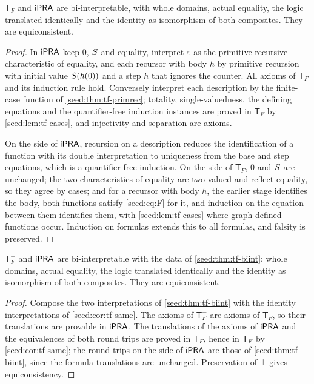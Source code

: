\begin{theorem}[Bi-interpretation]\label{seed:thm:tf-biint}
$\mathsf{T}_F$ and $\mathsf{iPRA}$ are bi-interpretable, with whole domains, actual
equality, the logic translated identically and the identity as isomorphism
of both composites. They are equiconsistent.
\end{theorem}

\begin{proof}
In $\mathsf{iPRA}$ keep $0$, $S$ and equality, interpret $\varepsilon$ as the
primitive recursive characteristic of equality, and each recursor with body
$h$ by primitive recursion with initial value $S(h(0))$ and a step $h$
that ignores the counter. All axioms of $\mathsf{T}_F$ and its induction
rule hold. Conversely interpret each description by the finite-case
function of \cref{seed:thm:tf-primrec}; totality, single-valuedness, the
defining equations and the quantifier-free induction instances are proved in
$\mathsf{T}_F$ by \cref{seed:lem:tf-cases}, and injectivity and separation
are axioms.

On the side of $\mathsf{iPRA}$, recursion on a description reduces the
identification of a function with its double interpretation to uniqueness
from the base and step equations, which is a quantifier-free induction. On
the side of $\mathsf{T}_F$, $0$ and $S$ are unchanged; the two
characteristics of equality are two-valued and reflect equality, so they
agree by cases; and for a recursor with body $h$, the earlier stage
identifies the body, both functions satisfy \eqref{seed:eq:F} for it, and
induction on the equation between them identifies them, with
\cref{seed:lem:tf-cases} where graph-defined functions occur. Induction on
formulas extends this to all formulas, and falsity is preserved.
\end{proof}

\begin{corollary}\label{seed:cor:tf-minus-biint}
$\mathsf{T}_F^{-}$ and $\mathsf{iPRA}$ are bi-interpretable with the data of
\cref{seed:thm:tf-biint}: whole domains, actual equality, the logic
translated identically and the identity as isomorphism of both composites.
They are equiconsistent.
\end{corollary}

\begin{proof}
Compose the two interpretations of \cref{seed:thm:tf-biint} with the identity
interpretations of \cref{seed:cor:tf-same}. The axioms of $\mathsf{T}_F^{-}$
are axioms of $\mathsf{T}_F$, so their translations are provable in $\mathsf{iPRA}$.
The translations of the axioms of $\mathsf{iPRA}$ and the equivalences of both round
trips are proved in $\mathsf{T}_F$, hence in $\mathsf{T}_F^{-}$ by
\cref{seed:cor:tf-same}; the round trips on the side of $\mathsf{iPRA}$ are those of
\cref{seed:thm:tf-biint}, since the formula translations are unchanged.
Preservation of $\bot$ gives equiconsistency.
\end{proof}

